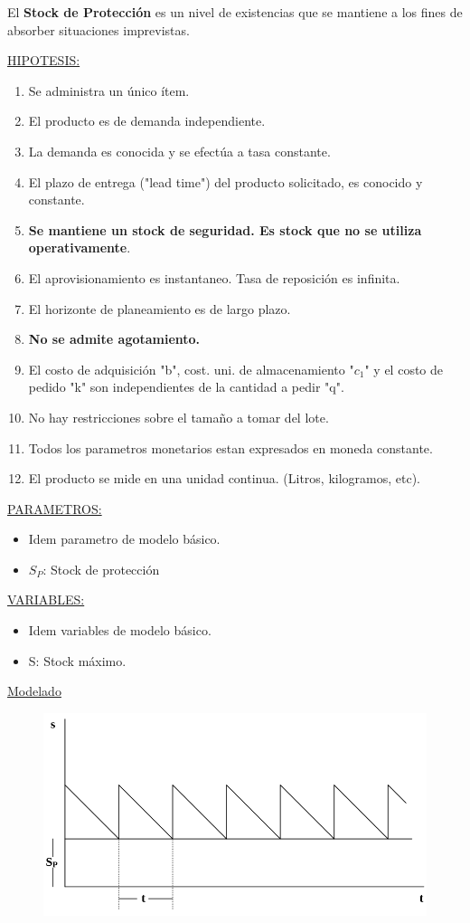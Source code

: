 \documentclass{article}
\begin{document}
El \textbf{Stock de Protección} es un nivel de existencias que se mantiene a los fines de absorber situaciones imprevistas.

\noindent
\underline{HIPOTESIS:}
\begin{enumerate}
    \item Se administra un único ítem.
    \item El producto es de demanda independiente.
    \item La demanda es conocida y se efectúa a tasa constante.
    \item El plazo de entrega ("lead time") del producto solicitado, es conocido y constante.
    \item \textbf{Se mantiene un stock de seguridad. Es stock que no se utiliza operativamente}.
    \item El aprovisionamiento es instantaneo. Tasa de reposición es infinita.
    \item El horizonte de planeamiento es de largo plazo.
    \item \textbf{No se admite agotamiento.}
    \item El costo de adquisición "b", cost. uni. de almacenamiento "\(c_1\)" y el costo de pedido "k" son independientes de la cantidad a pedir "q".
    \item No hay restricciones sobre el tamaño a tomar del lote.
    \item Todos los parametros monetarios estan expresados en moneda constante.
    \item El producto se mide en una unidad continua. (Litros, kilogramos, etc).
\end{enumerate}


\noindent
\underline{PARAMETROS:}
\begin{itemize}
    \item Idem parametro de modelo básico.
    \item \(S_P\): Stock de protección
\end{itemize}


\noindent
\underline{VARIABLES:}
\begin{itemize}
    \item Idem variables de modelo básico.
    \item S: Stock máximo.
\end{itemize}


\underline{Modelado}


\begin{figure}[h!]
    \includegraphics[width=\linewidth]{imagenes/stock-proteccion.png}
\end{figure}
\end{document}

